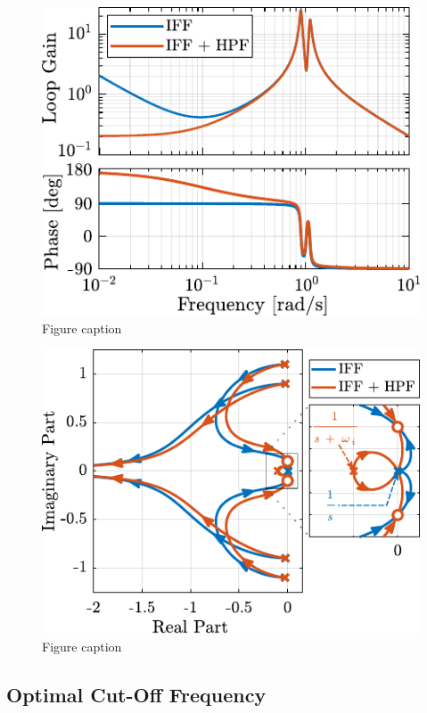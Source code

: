 \documentclass{ISMA_USD2020}
\begin{document}
\begin{figure}[htbp]
\centering
\includegraphics[scale=1]{figs/loop_gain_modified_iff.pdf}
\caption{\label{fig:loop_gain_modified_iff}Figure caption}
\end{figure}

\begin{figure}[htbp]
\centering
\includegraphics[scale=1]{figs/root_locus_modified_iff.pdf}
\caption{\label{fig:root_locus_modified_iff}Figure caption}
\end{figure}

\subsection{Optimal Cut-Off Frequency}
\label{sec:org04a5aa4}
\end{document}
